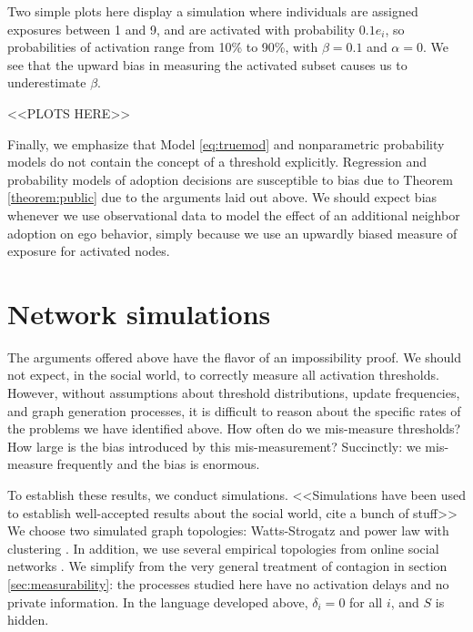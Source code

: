 \documentclass[a4paper]{article}
\begin{document}
Two simple plots here display a simulation where individuals are assigned exposures between 1 and 9, and are activated with probability $0.1 e_i$, so probabilities of activation range from 10\% to 90\%, with $\beta = 0.1$ and $\alpha = 0$. We see that the upward bias in measuring the activated subset causes us to underestimate $\beta$.

<<PLOTS HERE>>

Finally, we emphasize that Model \ref{eq:truemod} and nonparametric probability models do not contain the concept of a threshold explicitly. Regression and probability models of adoption decisions are susceptible to bias due to Theorem \ref{theorem:public} due to the arguments laid out above. We should expect bias whenever we use observational data to model the effect of an additional neighbor adoption on ego behavior, simply because we use an upwardly biased measure of exposure for activated nodes.

\section{Network simulations}

\begin{comment}
TODO:
  make rmse at k plots (need naive at k, plus the baseline of using all)
    can split this up into a nice panel or something
  make regression bias plots above
  change error plots to a table (e.g. how negative is the error)


\end{comment}

The arguments offered above have the flavor of an impossibility proof. We should not expect, in the social world, to correctly measure all activation thresholds. However, without assumptions about threshold distributions, update frequencies, and graph generation processes, it is difficult to reason about the specific rates of the problems we have identified above. How often do we mis-measure thresholds? How large is the bias introduced by this mis-measurement? Succinctly: we mis-measure frequently and the bias is enormous.

To establish these results, we conduct simulations. <<Simulations have been used to establish well-accepted results about the social world, cite a bunch of stuff>> We choose two simulated graph topologies: Watts-Strogatz \parencite{} and power law with clustering \parencite{}. In addition, we use several empirical topologies from online social networks \parencite{}. We simplify from the very general treatment of contagion in section \ref{sec:measurability}: the processes studied here have no activation delays and no private information. In the language developed above, $\delta_i = 0$ for all $i$, and $S$ is hidden.
\end{document}
